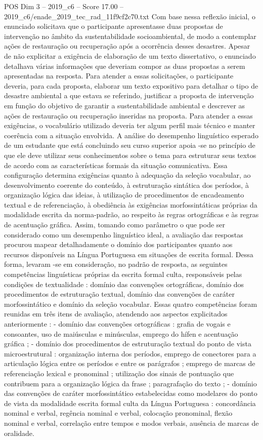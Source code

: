 \begin{textsample}{POS Dim 3 – 2019\_c6 – Score 17.00 – 2019\_c6/enade\_2019\_tec\_rad\_11f9cf2c70.txt}
Com base nessa reflexão inicial, o enunciado solicitava que o participante apresentasse duas propostas de intervenção no âmbito da sustentabilidade socioambiental, de modo a contemplar ações de restauração ou recuperação após a ocorrência desses desastres.
Apesar de não explicitar a exigência de elaboração de um texto dissertativo, o enunciado detalhava várias informações que deveriam compor as duas propostas a serem apresentadas na resposta.
Para atender a essas solicitações, o participante deveria, para cada proposta, elaborar um texto expositivo para detalhar o tipo de desastre ambiental a que estava se referindo, justificar a proposta de intervenção em função do objetivo de garantir a sustentabilidade ambiental e descrever as ações de restauração ou recuperação inseridas na proposta.
Para atender a essas exigências, o vocabulário utilizado deveria ter algum perfil mais técnico e manter coerência com a situação envolvida.
A análise do desempenho linguístico esperado de um estudante que está concluindo seu curso superior apoia -se no princípio de que ele deve utilizar seus conhecimentos sobre o tema para estruturar seus textos de acordo com as características formais da situação comunicativa.
Essa configuração determina exigências quanto à adequação da seleção vocabular, ao desenvolvimento coerente do conteúdo, à estruturação sintática dos períodos, à organização lógica das ideias, à utilização de procedimentos de encadeamento textual e de referenciação, à obediência às exigências morfossintáticas próprias da modalidade escrita da norma-padrão, ao respeito às regras ortográficas e às regras de acentuação gráfica.
Assim, tomando como parâmetro o que pode ser considerado como um desempenho linguístico ideal, a avaliação das respostas procurou mapear detalhadamente o domínio dos participantes quanto aos recursos disponíveis na Língua Portuguesa em situações de escrita formal.
Dessa forma, levaram -se em consideração, no padrão de resposta, as seguintes competências linguísticas próprias da escrita formal culta, responsáveis pelas condições de textualidade : domínio das convenções ortográficas, domínio dos procedimentos de estruturação textual, domínio das convenções de caráter morfossintático e domínio da seleção vocabular.
Essas quatro competências foram reunidas em três itens de avaliação, atendendo aos aspectos explicitados anteriormente : - domínio das convenções ortográficas : grafia de vogais e consoantes, uso de maiúsculas e minúsculas, emprego do hífen e acentuação gráfica ; - domínio dos procedimentos de estruturação textual do ponto de vista microestrutural : organização interna dos períodos, emprego de conectores para a articulação lógica entre os períodos e entre os parágrafos ; emprego de marcas de referenciação lexical e pronominal ; utilização dos sinais de pontuação que contribuem para a organização lógica da frase ; paragrafação do texto ; - domínio das convenções de caráter morfossintático estabelecidas como modelares do ponto de vista da modalidade escrita formal culta da Língua Portuguesa : concordância nominal e verbal, regência nominal e verbal, colocação pronominal, flexão nominal e verbal, correlação entre tempos e modos verbais, ausência de marcas de oralidade.

\end{textsample}
